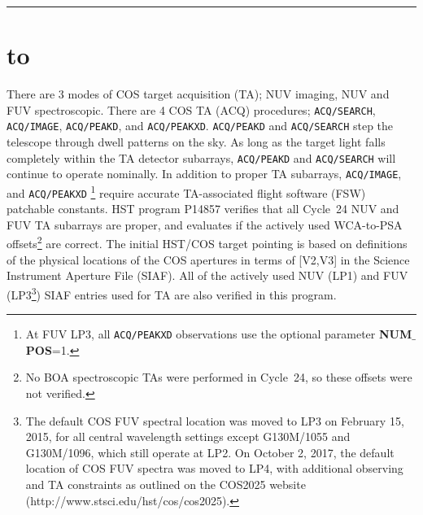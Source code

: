 \documentclass[12pt]{reportj}
\newcommand{\pid}[1]{{\rm P}#1}
\newcommand{\tacq}[1]{\texttt{ACQ/#1}}
\def\numpos{{\bf NUM$\_$POS}\rm}
\def\ssection#1{\addtocounter{section}{1} \setcounter{subsection}{0} \section*{\hbox to \hsize{\large\bf \arabic{section}. #1\hfill }}}
\begin{document}
\vspace{-0.1cm}
\noindent\rule{\linewidth}{1.0pt}
\vspace{-1cm}
\vspace{0.8cm}
\ssection{Introduction}\label{sec:Introduction}
\vspace{-0.3cm}
There are 3 modes of COS target acquisition (TA); NUV imaging, NUV and FUV spectroscopic.
There are 4 COS TA (ACQ) procedures; \tacq{SEARCH}, \tacq{IMAGE}, \tacq{PEAKD}, and \tacq{PEAKXD}. \tacq{PEAKD}  and \tacq{SEARCH}  step the telescope through dwell patterns on the sky. As long as the target light falls completely within
the TA detector subarrays, \tacq{PEAKD} and \tacq{SEARCH} will continue to operate nominally.
In addition to proper TA subarrays, \tacq{IMAGE}, and \tacq{PEAKXD} \footnote{At FUV LP3, all \tacq{PEAKXD} observations use the optional parameter \numpos=1.} require accurate TA-associated flight software (FSW) patchable constants.
HST program \pid{14857} verifies that all Cycle~24 NUV and FUV TA subarrays are proper, and evaluates if the actively used WCA-to-PSA offsets\footnote{No BOA spectroscopic TAs were performed in Cycle~24, so these offsets were not verified.} are correct.
The initial HST/COS target pointing is based on definitions of the physical locations of the COS apertures in terms of [V2,V3] in the Science Instrument Aperture File (SIAF).
All of the actively used NUV (LP1) and FUV (LP3\footnote{The default COS FUV spectral location was moved to LP3 on February 15, 2015, for all central wavelength settings except G130M/1055 and G130M/1096, which still operate at LP2. On October 2, 2017, the default location of COS FUV spectra was moved to LP4, with additional observing and TA constraints as outlined on the COS2025 website (http://www.stsci.edu/hst/cos/cos2025).}) SIAF entries used for TA are also verified in this program.
\end{document}
